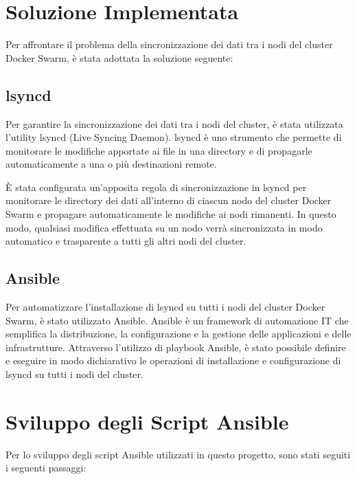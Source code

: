 \documentclass[a4paper, 12pt]{article}
\begin{document}
\section{Soluzione Implementata}
Per affrontare il problema della sincronizzazione dei dati tra i nodi del 
cluster Docker Swarm, è stata adottata la soluzione seguente:

\subsection{lsyncd}
Per garantire la sincronizzazione dei dati tra i nodi del cluster, 
è stata utilizzata l'utility lsyncd (Live Syncing Daemon). lsyncd è uno strumento 
che permette di monitorare le modifiche apportate ai file in una directory e di 
propagarle automaticamente a una o più destinazioni remote.

È stata configurata un'apposita regola di sincronizzazione in lsyncd per monitorare 
le directory dei dati all'interno di ciascun nodo del cluster Docker Swarm e propagare 
automaticamente le modifiche ai nodi rimanenti. In questo modo, qualsiasi modifica 
effettuata su un nodo verrà sincronizzata in modo automatico e trasparente a tutti 
gli altri nodi del cluster.

\subsection{Ansible}
Per automatizzare l'installazione di lsyncd su tutti i nodi del cluster Docker Swarm, 
è stato utilizzato Ansible. Ansible è un framework di automazione IT che 
semplifica la distribuzione, la configurazione e la gestione delle applicazioni e delle 
infrastrutture. Attraverso l'utilizzo di playbook Ansible, è stato possibile definire e 
eseguire in modo dichiarativo le operazioni di installazione e configurazione di lsyncd 
su tutti i nodi del cluster.

\newpage
\section{Sviluppo degli Script Ansible}
Per lo sviluppo degli script Ansible utilizzati in questo progetto, 
sono stati seguiti i seguenti passaggi:
\end{document}
